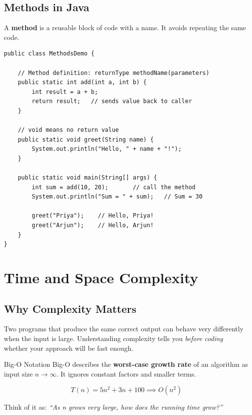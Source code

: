 \documentclass[12pt,a4paper,oneside]{book}
\begin{document}
\section{Methods in Java}

A \textbf{method} is a reusable block of code with a name. It avoids repeating the same code.

\begin{lstlisting}[caption={Defining and calling methods}]
public class MethodsDemo {

    // Method definition: returnType methodName(parameters)
    public static int add(int a, int b) {
        int result = a + b;
        return result;   // sends value back to caller
    }

    // void means no return value
    public static void greet(String name) {
        System.out.println("Hello, " + name + "!");
    }

    public static void main(String[] args) {
        int sum = add(10, 20);       // call the method
        System.out.println("Sum = " + sum);   // Sum = 30

        greet("Priya");    // Hello, Priya!
        greet("Arjun");    // Hello, Arjun!
    }
}
\end{lstlisting}

\chapter{Time and Space Complexity}

\section{Why Complexity Matters}

Two programs that produce the same correct output can behave very differently when the input is large. Understanding complexity tells you \textit{before coding} whether your approach will be fast enough.

\begin{definitionbox}{Big-O Notation}
Big-O describes the \textbf{worst-case growth rate} of an algorithm as input size $n \to \infty$. It ignores constant factors and smaller terms.

$$T(n) = 5n^2 + 3n + 100 \implies O(n^2)$$

Think of it as: \textit{``As n grows very large, how does the running time grow?''}
\end{definitionbox}
\end{document}
